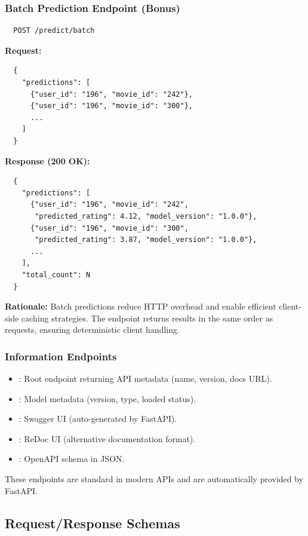 \subsubsection{Batch Prediction Endpoint (Bonus)}

\begin{verbatim}
  POST /predict/batch
\end{verbatim}

\textbf{Request:}
\begin{verbatim}
  {
    "predictions": [
      {"user_id": "196", "movie_id": "242"},
      {"user_id": "196", "movie_id": "300"},
      ...
    ]
  }
\end{verbatim}

\textbf{Response (200 OK):}
\begin{verbatim}
  {
    "predictions": [
      {"user_id": "196", "movie_id": "242", 
       "predicted_rating": 4.12, "model_version": "1.0.0"},
      {"user_id": "196", "movie_id": "300", 
       "predicted_rating": 3.87, "model_version": "1.0.0"},
      ...
    ],
    "total_count": N
  }
\end{verbatim}

\textbf{Rationale:} Batch predictions reduce HTTP overhead and enable efficient client-side caching strategies. 
The endpoint returns results in the same order as requests, ensuring deterministic client handling.

\subsubsection{Information Endpoints}

\begin{itemize}
  \item {}: Root endpoint returning API metadata (name, version, docs URL).
  \item {}: Model metadata (version, type, loaded status).
  \item {}: Swagger UI (auto-generated by FastAPI).
  \item {}: ReDoc UI (alternative documentation format).
  \item {}: OpenAPI schema in JSON.
\end{itemize}

These endpoints are standard in modern APIs and are automatically provided by FastAPI.

\subsection{Request/Response Schemas}


